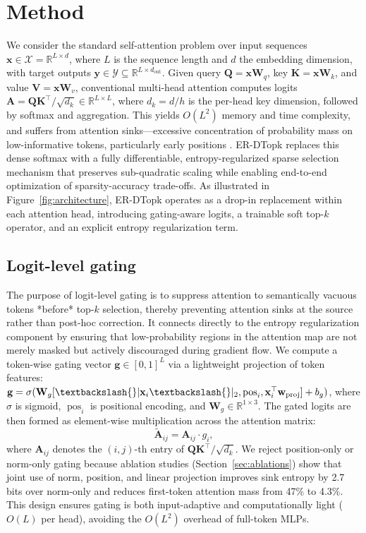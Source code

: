 \documentclass{article}
\begin{document}
\section{Method}
We consider the standard self-attention problem over input sequences $\mathbf{x} \in \mathcal{X} = \mathbb{R}^{L \times d}$, where $L$ is the sequence length and $d$ the embedding dimension, with target outputs $\mathbf{y} \in \mathcal{Y} \subseteq \mathbb{R}^{L \times d_{\mathrm{out}}}$. Given query $\mathbf{Q} = \mathbf{x}\mathbf{W}_q$, key $\mathbf{K} = \mathbf{x}\mathbf{W}_k$, and value $\mathbf{V} = \mathbf{x}\mathbf{W}_v$, conventional multi-head attention computes logits $\mathbf{A} = \mathbf{Q}\mathbf{K}^\top / \sqrt{d_k} \in \mathbb{R}^{L \times L}$, where $d_k = d / h$ is the per-head key dimension, followed by softmax and aggregation. This yields $O(L^2)$ memory and time complexity, and suffers from attention sinks---excessive concentration of probability mass on low-informative tokens, particularly early positions \cite{shen2026}. ER-DTopk replaces this dense softmax with a fully differentiable, entropy-regularized sparse selection mechanism that preserves sub-quadratic scaling while enabling end-to-end optimization of sparsity-accuracy trade-offs. As illustrated in Figure~\ref{fig:architecture}, ER-DTopk operates as a drop-in replacement within each attention head, introducing gating-aware logits, a trainable soft top-$k$ operator, and an explicit entropy regularization term.

\subsection{Logit-level gating}
The purpose of logit-level gating is to suppress attention to semantically vacuous tokens *before* top-$k$ selection, thereby preventing attention sinks at the source rather than post-hoc correction. It connects directly to the entropy regularization component by ensuring that low-probability regions in the attention map are not merely masked but actively discouraged during gradient flow. We compute a token-wise gating vector $\mathbf{g} \in [0,1]^L$ via a lightweight projection of token features: $\mathbf{g} = \sigma(\mathbf{W}_g [\textbackslash{}|\mathbf{x}_i\textbackslash{}|_2, \operatorname{pos}_i, \mathbf{x}_i^\top \mathbf{w}_{\mathrm{proj}}] + b_g)$, where $\sigma$ is sigmoid, $\operatorname{pos}_i$ is positional encoding, and $\mathbf{W}_g \in \mathbb{R}^{1 \times 3}$. The gated logits are then formed as element-wise multiplication across the attention matrix:
\begin{equation}
\tilde{\mathbf{A}}_{ij} = \mathbf{A}_{ij} \cdot g_i,
\label{eq:gated_logits}
\end{equation}
where $\mathbf{A}_{ij}$ denotes the $(i,j)$-th entry of $\mathbf{Q}\mathbf{K}^\top / \sqrt{d_k}$. We reject position-only or norm-only gating because ablation studies (Section~\ref{sec:ablations}) show that joint use of norm, position, and linear projection improves sink entropy by 2.7 bits over norm-only and reduces first-token attention mass from 47\% to 4.3\%. This design ensures gating is both input-adaptive and computationally light ($O(L)$ per head), avoiding the $O(L^2)$ overhead of full-token MLPs.
\end{document}
